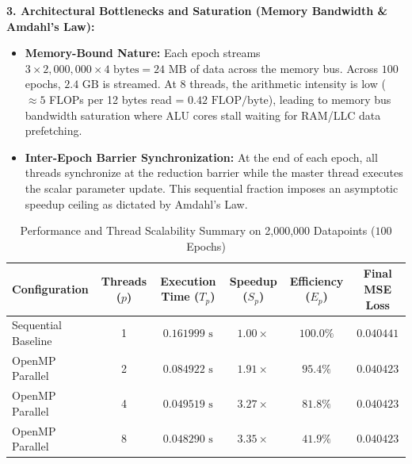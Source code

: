\documentclass[12pt]{article}
\begin{document}
\textbf{3. Architectural Bottlenecks and Saturation (Memory Bandwidth \& Amdahl's Law):}
\begin{itemize}
    \item \textbf{Memory-Bound Nature:} Each epoch streams $3 \times 2,000,000 \times 4\text{ bytes} = 24\text{ MB}$ of data across the memory bus. Across $100$ epochs, $2.4\text{ GB}$ is streamed. At 8 threads, the arithmetic intensity is low ($\approx 5$ FLOPs per 12 bytes read = $0.42\text{ FLOP/byte}$), leading to memory bus bandwidth saturation where ALU cores stall waiting for RAM/LLC data prefetching.
    \item \textbf{Inter-Epoch Barrier Synchronization:} At the end of each epoch, all threads synchronize at the reduction barrier while the master thread executes the scalar parameter update. This sequential fraction imposes an asymptotic speedup ceiling as dictated by Amdahl's Law.
\end{itemize}

\begin{table}[H]
\centering
\begin{tabular}{lccccc}
\toprule
\textbf{Configuration} & \textbf{Threads ($p$)} & \textbf{Execution Time ($T_p$)} & \textbf{Speedup ($S_p$)} & \textbf{Efficiency ($E_p$)} & \textbf{Final MSE Loss} \\
\midrule
Sequential Baseline & 1 & $0.161999\text{ s}$ & $1.00\times$ & $100.0\%$ & $0.040441$ \\
OpenMP Parallel     & 2 & $0.084922\text{ s}$ & $1.91\times$ & $95.4\%$  & $0.040423$ \\
OpenMP Parallel     & 4 & $0.049519\text{ s}$ & $3.27\times$ & $81.8\%$  & $0.040423$ \\
OpenMP Parallel     & 8 & $0.048290\text{ s}$ & $3.35\times$ & $41.9\%$  & $0.040423$ \\
\bottomrule
\end{tabular}
\caption{Performance and Thread Scalability Summary on 2,000,000 Datapoints ($100$ Epochs)}
\end{table}
\end{document}
